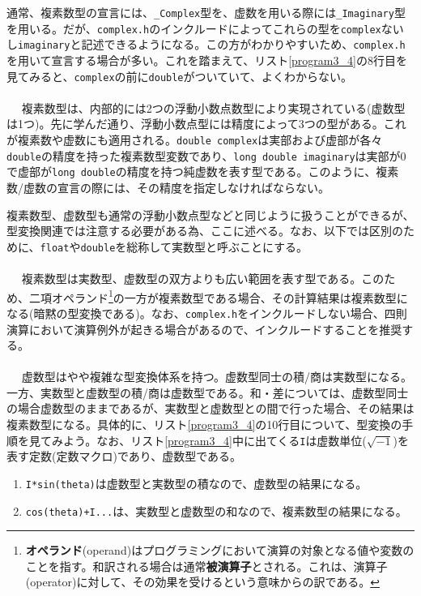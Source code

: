 通常、複素数型の宣言には、\verb|_Complex|型を、虚数を用いる際には\verb|_Imaginary|型を用いる。だが、\verb|complex.h|のインクルードによってこれらの型を\verb|complex|ないし\verb|imaginary|と記述できるようになる。この方がわかりやすいため、\verb|complex.h|を用いて宣言する場合が多い。これを踏まえて、リスト\ref{program3_4}の8行目を見てみると、\verb|complex|の前に\verb|double|がついていて、よくわからない。
\\ \\　
複素数型は、内部的には2つの浮動小数点数型により実現されている(虚数型は1つ)。先に学んだ通り、浮動小数点型には精度によって3つの型がある。これが複素数や虚数にも適用される。\verb|double complex|は実部および虚部が各々\verb|double|の精度を持った複素数型変数であり、\verb|long double imaginary|は実部が0で虚部が\verb|long double|の精度を持つ純虚数を表す型である。このように、複素数/虚数の宣言の際には、その精度を指定しなければならない。

複素数型、虚数型も通常の浮動小数点型などと同じように扱うことができるが、型変換関連では注意する必要がある為、ここに述べる。なお、以下では区別のために、\verb|float|や\verb|double|を総称して実数型と呼ぶことにする。
\\ \\　
複素数型は実数型、虚数型の双方よりも広い範囲を表す型である。このため、二項オペランド\footnote{\textbf{オペランド}(operand)はプログラミングにおいて演算の対象となる値や変数のことを指す。和訳される場合は通常\textbf{被演算子}とされる。これは、演算子(operator)に対して、その効果を受けるという意味からの訳である。}の一方が複素数型である場合、その計算結果は複素数型になる(暗黙の型変換である)。なお、\verb|complex.h|をインクルードしない場合、四則演算において演算例外が起きる場合があるので、インクルードすることを推奨する。
\\ \\　
虚数型はやや複雑な型変換体系を持つ。虚数型同士の積/商は実数型になる。一方、実数型と虚数型の積/商は虚数型である。和・差については、虚数型同士の場合虚数型のままであるが、実数型と虚数型との間で行った場合、その結果は複素数型になる。具体的に、リスト\ref{program3_4}の10行目について、型変換の手順を見てみよう。なお、リスト\ref{program3_4}中に出てくる\verb|I|は虚数単位($\sqrt{-1}$)を表す定数(定数マクロ)であり、虚数型である。
\begin{enumerate}
\item \verb|I*sin(theta)|は虚数型と実数型の積なので、虚数型の結果になる。
\item \verb|cos(theta)+I...|は、実数型と虚数型の和なので、複素数型の結果になる。
\end{enumerate}


